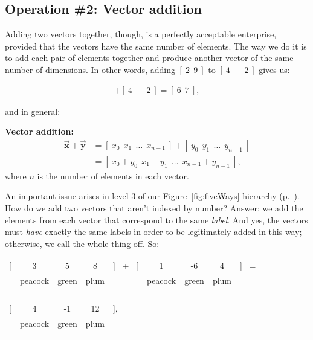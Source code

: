 \subsection{Operation \#2: Vector addition}

Adding two vectors together, though, is a perfectly acceptable enterprise,
provided that the vectors have the same number of elements. The way we do it is
to add each pair of elements together and produce another vector of the same
number of dimensions. In other words, adding $[\ 2\ \ 9\ ]$ to $[\ 4\ \ -2\ ]$
gives us:

\vspace{-.15in}
\begin{align*}
[\ 2\ \ 9\ ] + [\ 4\ \ -2\ ] = [\ 6\ \ 7\ ],
\end{align*}
\vspace{-.15in}

and in general:

\vspace{-.15in}
\begin{center}
\begin{framed}
\textbf{Vector addition:}
\begin{align*}
\overrightarrow{\textbf{x}} + \overrightarrow{\textbf{y}} &=
[\ x_0\ \ x_1\ \ \dots \ \ x_{n-1}\ ] +
[\ y_0\ \ y_1\ \ \dots \ \ y_{n-1}\ ] \\
&= [\ x_0 + y_0\ \ x_1 + y_1\ \ \dots \ \ x_{n-1} + y_{n-1}\ ],
\end{align*}
where $n$ is the number of elements in each vector.
\end{framed}
\end{center}
\vspace{-.15in}

An important issue arises in level 3 of our Figure~\ref{fig:fiveWays} hierarchy
(p.~\pageref{fig:fiveWays}). How do we add two vectors that aren't indexed by
number? Answer: we add the elements from each vector that correspond to the
same \textit{label}. And yes, the vectors must \textit{have} exactly the same
labels in order to be legitimately added in this way; otherwise, we call the
whole thing off. So:


\begin{center}
\begin{tabular}{ccccccccc}
[ & 3 & 5 & 8 & ] \ + \ [ & 1 & -6 & 4 & ] \ = \\
& \scriptsize{peacock} & \scriptsize{green} & \scriptsize{plum} & &
\scriptsize{peacock} & \scriptsize{green} & \scriptsize{plum} & \\
\normalsize
\end{tabular}
\vspace{-.15in}
\begin{tabular}{ccccc}
[ & 4 & -1 & 12 & ], \\
& \scriptsize{peacock} & \scriptsize{green} & \scriptsize{plum} & \\
\normalsize
\end{tabular}
\end{center}
\vspace{-.15in}

